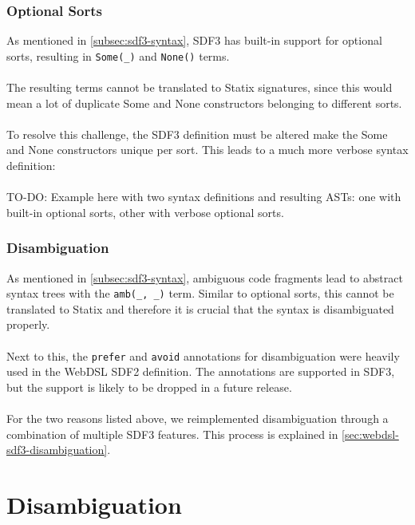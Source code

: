       \subsubsection{\label{subsubsec:sdf3-optional-sorts}Optional Sorts}

        As mentioned in \cref{subsec:sdf3-syntax}, SDF3 has built-in support for optional sorts, resulting in \texttt{Some(\_)} and \texttt{None()} terms.
        \\\\The resulting terms cannot be translated to Statix signatures, since this would mean a lot of duplicate Some and None constructors belonging to different sorts.
        \\\\To resolve this challenge, the SDF3 definition must be altered make the Some and None constructors unique per sort. This leads to a much more verbose syntax definition:
        \\\\TO-DO: Example here with two syntax definitions and resulting ASTs: one with built-in optional sorts, other with verbose optional sorts.

      \subsubsection{Disambiguation}

        As mentioned in \cref{subsec:sdf3-syntax}, ambiguous code fragments lead to abstract syntax trees with the \texttt{amb(\_, \_)} term. Similar to optional sorts, this cannot be translated to Statix and therefore it is crucial that the syntax is disambiguated properly.
        \\\\Next to this, the \texttt{prefer} and \texttt{avoid} annotations for disambiguation were heavily used in the WebDSL SDF2 definition. The annotations are supported in SDF3, but the support is likely to be dropped in a future release.
        \\\\For the two reasons listed above, we reimplemented disambiguation through a combination of multiple SDF3 features. This process is explained in \cref{sec:webdsl-sdf3-disambiguation}.

  \section{\label{sec:webdsl-sdf3-disambiguation}Disambiguation}
  
